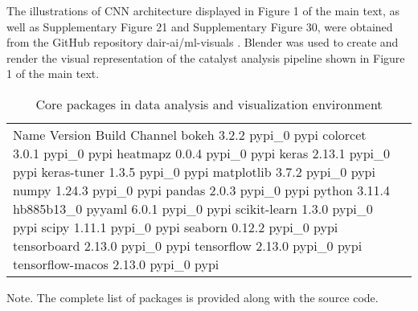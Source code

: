 The illustrations of CNN architecture displayed in Figure 1 of the main text, as well as  Supplementary Figure 21 and Supplementary Figure 30, were obtained from the GitHub repository dair-ai/ml-visuals \cite{Saravia_ML_Visuals_2021}. Blender was used to create and render the visual representation of the catalyst analysis pipeline shown in Figure 1 of the main text.

\begin{table}[h]
    \centering
    \begin{tabular}{lr}
      \hline
      Name	Version	Build	Channel
      \hline
      bokeh	3.2.2	pypi_0	pypi
      colorcet	3.0.1	pypi_0	pypi
      heatmapz	0.0.4	pypi_0	pypi
      keras	2.13.1	pypi_0	pypi
      keras-tuner	1.3.5	pypi_0	pypi
      matplotlib	3.7.2	pypi_0	pypi
      numpy	1.24.3	pypi_0	pypi
      pandas	2.0.3	pypi_0	pypi
      python	3.11.4	hb885b13_0
      pyyaml	6.0.1	pypi_0	pypi
      scikit-learn	1.3.0	pypi_0	pypi
      scipy	1.11.1	pypi_0	pypi
      seaborn	0.12.2	pypi_0	pypi
      tensorboard	2.13.0	pypi_0	pypi
      tensorflow	2.13.0	pypi_0	pypi
      tensorflow-macos	2.13.0	pypi_0	pypi
      \hline
    \end{tabular}
    \caption{Core packages in data analysis and visualization environment}
    \label{si_table20}
\end{table}
Note. The complete list of packages is provided along with the source code.
